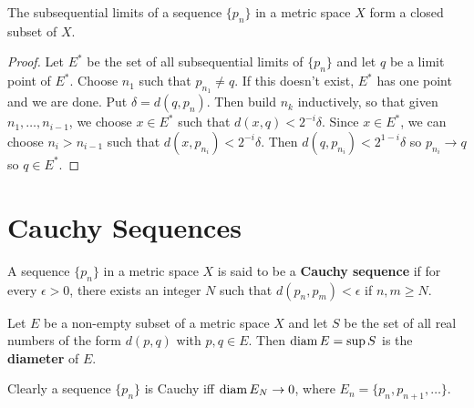 \begin{theorem} %
The subsequential limits of a sequence $\{p_n\}$ in a metric space $X$ form a closed subset of $X$.

\begin{proof}
Let $E^*$ be the set of all subsequential limits of $\{p_n\}$ and let $q$ be a limit point of $E^*$. Choose $n_1$ such that $p_{n_1} \ne q$. If this doesn't exist, $E^*$ has one point and we are done. Put $\delta = d(q, p_n)$. Then build $n_k$ inductively, so that given $n_1, \dotsc, n_{i-1}$, we choose $x \in E^*$ such that $d(x, q) < 2^{-i} \delta$. Since $x \in E^*$, we can choose $n_i > n_{i-1}$ such that $d(x, p_{n_i}) < 2^{-i} \delta$. Then $d(q, p_{n_i}) < 2^{1-i} \delta$ so $p_{n_i} \to q$ so $q \in E^*$.
\end{proof}
\end{theorem}

\section{Cauchy Sequences}

\begin{definition}
A sequence $\{p_n\}$ in a metric space $X$ is said to be a \textbf{Cauchy sequence} if for every $\epsilon > 0$, there exists an integer $N$ such that $d(p_n, p_m) < \epsilon$ if $n, m \ge N$.

Let $E$ be a non-empty subset of a metric space $X$ and let $S$ be the set of all real numbers of the form $d(p, q)$ with $p, q \in E$. Then $\operatorname{diam} E = \sup S$ is the \textbf{diameter} of $E$.

Clearly a sequence $\{p_n\}$ is Cauchy iff $\operatorname{diam} E_N \rightarrow 0$, where $E_n = \{p_{n}, p_{n+1}, \dotsc\}$.
\end{definition}

